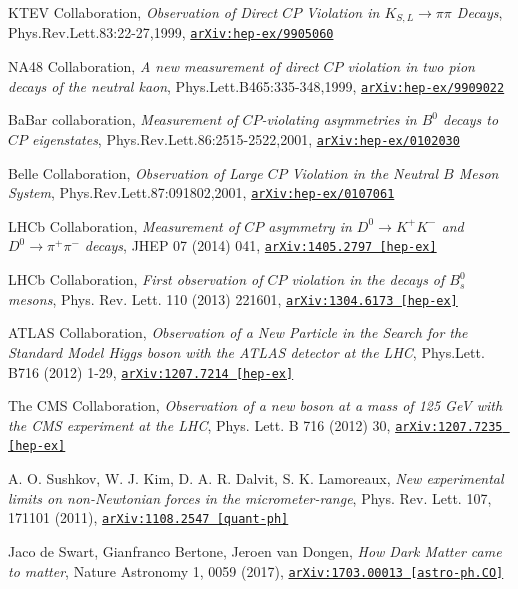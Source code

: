 \documentclass[12pt,a4paper,openright,twoside]{report}
\newcommand{\bibref}[4]{#1, \textit{#2}, #3 #4}
\begin{document}
\begin{thebibliography}{9}
	\bibref{KTEV Collaboration}{Observation of Direct $CP$ Violation in $K_{S,L}\to \pi\pi$ Decays}{Phys.Rev.Lett.83:22-27,1999,}{\href{https://arxiv.org/abs/hep-ex/9905060}{\texttt{arXiv:hep-ex/9905060}}}

 \bibref{NA48 Collaboration}{A new measurement of direct $CP$ violation in two pion decays of the neutral kaon}{Phys.Lett.B465:335-348,1999,}{\href{https://arxiv.org/abs/hep-ex/9909022}{\texttt{arXiv:hep-ex/9909022}}}

	\bibref{BaBar collaboration}{Measurement of $CP$-violating asymmetries in $B^0$ decays to $CP$ eigenstates}{Phys.Rev.Lett.86:2515-2522,2001,}{\href{https://arxiv.org/abs/hep-ex/0102030}{\texttt{arXiv:hep-ex/0102030}}}

	\bibref{Belle Collaboration}{Observation of Large $CP$ Violation in the Neutral $B$ Meson System}{Phys.Rev.Lett.87:091802,2001,}{\href{https://arxiv.org/abs/hep-ex/0107061}{\texttt{arXiv:hep-ex/0107061}}}

	\bibref{LHCb Collaboration}{Measurement of $CP$ asymmetry in $D^0 \to K^+ K^-$ and $D^0 \to \pi^+ \pi^-$ decays}{JHEP 07 (2014) 041,}{\href{https://arxiv.org/abs/1405.2797}{\texttt{arXiv:1405.2797 [hep-ex]}}}

	\bibref{LHCb Collaboration}{First observation of $CP$ violation in the decays of $B^0_s$ mesons}{Phys. Rev. Lett. 110 (2013) 221601,}{\href{https://arxiv.org/abs/1304.6173}{\texttt{arXiv:1304.6173 [hep-ex]}}}
	
	\bibref{ATLAS Collaboration}{Observation of a New Particle in the Search for the Standard Model Higgs boson with the ATLAS detector at the LHC}{Phys.Lett. B716 (2012) 1-29,}{\href{https://arxiv.org/abs/1207.7214}{\texttt{arXiv:1207.7214 [hep-ex]}}}
	
	\bibref{The CMS Collaboration}{Observation of a new boson at a mass of 125 GeV with the CMS experiment at the LHC}{Phys. Lett. B 716 (2012) 30,}{\href{https://arxiv.org/abs/1207.7235}{\texttt{arXiv:1207.7235 [hep-ex]}}}
	
	\bibref{A. O. Sushkov, W. J. Kim, D. A. R. Dalvit, S. K. Lamoreaux}{New experimental limits on non-Newtonian forces in the micrometer-range}{Phys. Rev. Lett. 107, 171101 (2011),}{\href{https://arxiv.org/abs/1108.2547}{\texttt{arXiv:1108.2547 [quant-ph]}}}
	
	\bibref{Jaco de Swart, Gianfranco Bertone, Jeroen van Dongen}{How Dark Matter came to matter}{Nature Astronomy 1, 0059 (2017),}{\href{https://arxiv.org/abs/1703.00013}{\texttt{arXiv:1703.00013 [astro-ph.CO]}}}
	

\end{thebibliography}
\end{document}
